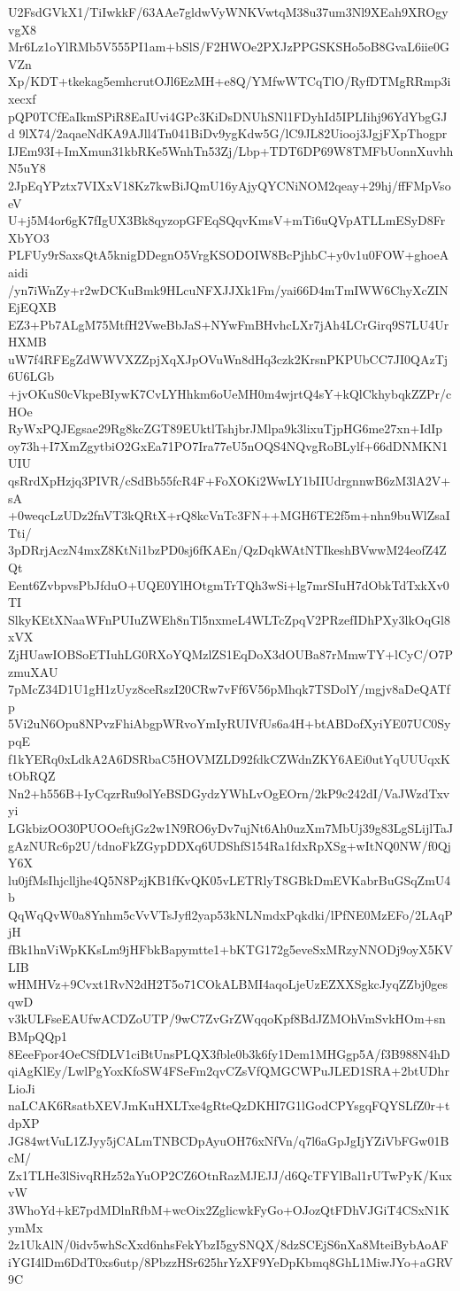U2FsdGVkX1/TiIwkkF/63AAe7gldwVyWNKVwtqM38u37um3Nl9XEah9XROgyvgX8
Mr6Lz1oYlRMb5V555PI1am+bSlS/F2HWOe2PXJzPPGSKSHo5oB8GvaL6iie0GVZn
Xp/KDT+tkekag5emhcrutOJl6EzMH+e8Q/YMfwWTCqTlO/RyfDTMgRRmp3ixecxf
pQP0TCfEaIkmSPiR8EaIUvi4GPc3KiDsDNUhSNl1FDyhId5IPLIihj96YdYbgGJd
9lX74/2aqaeNdKA9AJll4Tn041BiDv9ygKdw5G/lC9JL82Uiooj3JgjFXpThogpr
IJEm93I+ImXmun31kbRKe5WnhTn53Zj/Lbp+TDT6DP69W8TMFbUonnXuvhhN5uY8
2JpEqYPztx7VIXxV18Kz7kwBiJQmU16yAjyQYCNiNOM2qeay+29hj/ffFMpVsoeV
U+j5M4or6gK7fIgUX3Bk8qyzopGFEqSQqvKmsV+mTi6uQVpATLLmESyD8FrXbYO3
PLFUy9rSaxsQtA5knigDDegnO5VrgKSODOIW8BcPjhbC+y0v1u0FOW+ghoeAaidi
/yn7iWnZy+r2wDCKuBmk9HLcuNFXJJXk1Fm/yai66D4mTmIWW6ChyXcZINEjEQXB
EZ3+Pb7ALgM75MtfH2VweBbJaS+NYwFmBHvhcLXr7jAh4LCrGirq9S7LU4UrHXMB
uW7f4RFEgZdWWVXZZpjXqXJpOVuWn8dHq3czk2KrsnPKPUbCC7JI0QAzTj6U6LGb
+jvOKuS0cVkpeBIywK7CvLYHhkm6oUeMH0m4wjrtQ4sY+kQlCkhybqkZZPr/cHOe
RyWxPQJEgsae29Rg8kcZGT89EUktlTshjbrJMlpa9k3lixuTjpHG6me27xn+IdIp
oy73h+I7XmZgytbiO2GxEa71PO7Ira77eU5nOQS4NQvgRoBLylf+66dDNMKN1UIU
qsRrdXpHzjq3PIVR/cSdBb55fcR4F+FoXOKi2WwLY1bIIUdrgnnwB6zM3lA2V+sA
+0weqcLzUDz2fnVT3kQRtX+rQ8kcVnTc3FN++MGH6TE2f5m+nhn9buWlZsaITti/
3pDRrjAczN4mxZ8KtNi1bzPD0sj6fKAEn/QzDqkWAtNTIkeshBVwwM24eofZ4ZQt
Eent6ZvbpvsPbJfduO+UQE0YlHOtgmTrTQh3wSi+lg7mrSIuH7dObkTdTxkXv0TI
SlkyKEtXNaaWFnPUIuZWEh8nTl5nxmeL4WLTcZpqV2PRzefIDhPXy3lkOqGl8xVX
ZjHUawIOBSoETIuhLG0RXoYQMzlZS1EqDoX3dOUBa87rMmwTY+lCyC/O7PzmuXAU
7pMcZ34D1U1gH1zUyz8ceRszI20CRw7vFf6V56pMhqk7TSDolY/mgjv8aDeQATfp
5Vi2uN6Opu8NPvzFhiAbgpWRvoYmIyRUIVfUs6a4H+btABDofXyiYE07UC0SypqE
f1kYERq0xLdkA2A6DSRbaC5HOVMZLD92fdkCZWdnZKY6AEi0utYqUUUqxKtObRQZ
Nn2+h556B+IyCqzrRu9olYeBSDGydzYWhLvOgEOrn/2kP9c242dI/VaJWzdTxvyi
LGkbizOO30PUOOeftjGz2w1N9RO6yDv7ujNt6Ah0uzXm7MbUj39g83LgSLijlTaJ
gAzNURc6p2U/tdnoFkZGypDDXq6UDShfS154Ra1fdxRpXSg+wItNQ0NW/f0QjY6X
lu0jfMsIhjclljhe4Q5N8PzjKB1fKvQK05vLETRlyT8GBkDmEVKabrBuGSqZmU4b
QqWqQvW0a8Ynhm5cVvVTsJyfl2yap53kNLNmdxPqkdki/lPfNE0MzEFo/2LAqPjH
fBk1hnViWpKKsLm9jHFbkBapymtte1+bKTG172g5eveSxMRzyNNODj9oyX5KVLIB
wHMHVz+9Cvxt1RvN2dH2T5o71COkALBMI4aqoLjeUzEZXXSgkcJyqZZbj0gesqwD
v3kULFseEAUfwACDZoUTP/9wC7ZvGrZWqqoKpf8BdJZMOhVmSvkHOm+snBMpQQp1
8EeeFpor4OeCSfDLV1ciBtUnsPLQX3fble0b3k6fy1Dem1MHGgp5A/f3B988N4hD
qiAgKlEy/LwlPgYoxKfoSW4FSeFm2qvCZsVfQMGCWPuJLED1SRA+2btUDhrLioJi
naLCAK6RsatbXEVJmKuHXLTxe4gRteQzDKHI7G1lGodCPYsgqFQYSLfZ0r+tdpXP
JG84wtVuL1ZJyy5jCALmTNBCDpAyuOH76xNfVn/q7l6aGpJgIjYZiVbFGw01BcM/
Zx1TLHe3lSivqRHz52aYuOP2CZ6OtnRazMJEJJ/d6QcTFYlBal1rUTwPyK/KuxvW
3WhoYd+kE7pdMDlnRfbM+wcOix2ZglicwkFyGo+OJozQtFDhVJGiT4CSxN1KymMx
2z1UkAlN/0idv5whScXxd6nhsFekYbzI5gySNQX/8dzSCEjS6nXa8MteiBybAoAF
iYGI4lDm6DdT0xs6utp/8PbzzHSr625hrYzXF9YeDpKbmq8GhL1MiwJYo+aGRV9C
